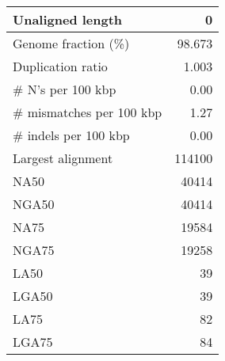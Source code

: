 \documentclass[12pt,a4paper]{article}
\begin{document}
\begin{table}[ht]
\begin{center}
\begin{tabular}{|l*{1}{|r}|}
Unaligned length & 0 \\ \hline
Genome fraction (\%) & 98.673 \\ \hline
Duplication ratio & 1.003 \\ \hline
\# N's per 100 kbp & 0.00 \\ \hline
\# mismatches per 100 kbp & 1.27 \\ \hline
\# indels per 100 kbp & 0.00 \\ \hline
Largest alignment & 114100 \\ \hline
NA50 & 40414 \\ \hline
NGA50 & 40414 \\ \hline
NA75 & 19584 \\ \hline
NGA75 & 19258 \\ \hline
LA50 & 39 \\ \hline
LGA50 & 39 \\ \hline
LA75 & 82 \\ \hline
LGA75 & 84 \\ \hline
\end{tabular}
\end{center}
\end{table}
\end{document}

